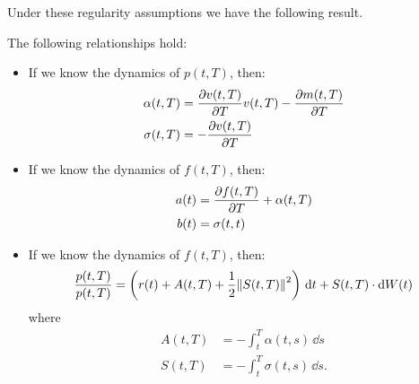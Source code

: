 Under these regularity assumptions we have the following result.
\begin{theorem}
    The following relationships hold:
    \begin{itemize}
        \item If we know the dynamics of $p(t,T)$, then:
        \begin{align}
            \alpha(t,T) &= \pdv{v(t,T)}{T}v(t,T) - \pdv{m(t,T)}{T} \\
            \sigma(t,T) &= -\pdv{v(t,T)}{T}
        \end{align}
        \item If we know the dynamics of $f(t,T)$, then:
        \begin{align}
            a(t) &= \pdv{f(t,T)}{T} + \alpha(t,T) \\
            b(t) &= \sigma(t,t)
        \end{align}
        \item If we know the dynamics of $f(t,T)$, then:
        \begin{align}
            \frac{p(t,T)}{p(t,T)} = \left(r(t) + A(t,T) + \frac{1}{2}\norm{S(t,T)}^2\right)\,\dd t + S(t,T)\cdot \dd W(t)
        \end{align}
        where
        \begin{align}
            A(t,T) &= -\int_t^T \alpha(t,s)\,\dd s \\
            S(t,T) &= -\int_t^T \sigma(t,s)\,\dd s.
        \end{align}
    \end{itemize}
\end{theorem}

